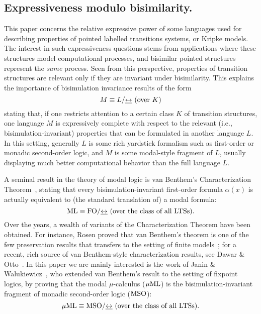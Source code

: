 \subsection{Expressiveness modulo bisimilarity.}
%
This paper concerns the relative expressive power of some languages used for
describing properties of pointed labelled transitions systems, or Kripke
models.
The interest in such expressiveness questions stems from applications where
these structures model computational processes, and bisimilar pointed
structures represent the \emph{same} process.
Seen from this perspective, properties of transition structures are relevant
only if they are invariant under bisimilarity.
This explains the importance of bisimulation invariance results of the form
\begin{equation*}
M \equiv L / {\bis} \text{ (over $K$)}
\end{equation*}
stating that,  if one restricts attention to a certain class $K$ of transition
structures, one language $M$ is expressively complete with respect to the
relevant (i.e., bisimulation-invariant) properties that can be formulated in
another language $L$.
In this setting, generally $L$ is some rich yardstick formalism such as
first-order or monadic second-order logic, and $M$ is some modal-style
fragment of $L$, usually displaying much better computational behavior
than the full language $L$.

A seminal result in the theory of modal logic is van Benthem's Characterization
Theorem~\cite{vanBenthemPhD}, stating that every bisimulation-invariant
first-order formula $\alpha(x)$ is actually equivalent to (the standard
translation of) a modal formula:
\begin{equation*}
\ML \equiv \fo/{\bis} \text{ (over the class of all LTSs)}.
\end{equation*}
Over the years, a wealth of variants of the Characterization Theorem have been
obtained.
For instance, Rosen proved that van Benthem's theorem is one of the few
preservation results that transfers to the setting of finite
models~\cite{rose:moda97}; for a recent, rich source of van Benthem-style
characterization results, see Dawar \& Otto~\cite{DawarO09}.
In this paper we are mainly interested is the work of Janin \&
Walukiewicz~\cite{Jan96}, who extended van Benthem's result to the setting
of fixpoint logics, by proving that the modal $\mu$-calculus ($\mu\mathrm{ML}$) is the
bisimulation-invariant fragment of monadic second-order
logic ($\mathrm{MSO}$):
\begin{equation*}
\MC \equiv \mso/{\bis} \text{ (over the class of all LTSs)}.
\end{equation*}

